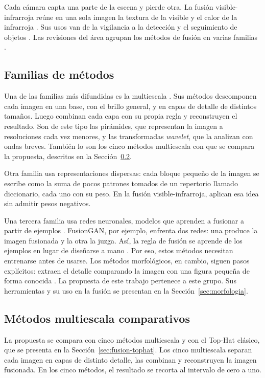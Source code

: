 Cada cámara capta una parte de la escena y pierde otra. La fusión visible-infrarroja reúne en una sola
imagen la textura de la visible y el calor de la infrarroja \parencite{ma2019}. Sus usos van de la
vigilancia a la detección y el seguimiento de objetos \parencite{li2017, zhang2023}. Las revisiones del
área agrupan los métodos de fusión en varias familias \parencite{li2017, ma2019, singh2023}.

\subsection{Familias de métodos}

Una de las familias más difundidas es la multiescala \parencite{li2017}. Sus métodos descomponen cada
imagen en una base, con el brillo general, y en capas de detalle de distintos tamaños. Luego combinan
cada capa con su propia regla y reconstruyen el resultado. Son de este tipo las pirámides, que
representan la imagen a resoluciones cada vez menores, y las transformadas \textit{wavelet}, que la
analizan con ondas breves. También lo son los cinco métodos multiescala con que se compara la propuesta,
descritos en la Sección~\ref{sec:comparativos}.

Otra familia usa representaciones dispersas: cada bloque pequeño de la imagen se escribe como la suma de
pocos patrones tomados de un repertorio llamado diccionario, cada uno con su peso. En la fusión
visible-infrarroja, \textcite{wang2014} aplican esa idea sin admitir pesos negativos.

Una tercera familia usa redes neuronales, modelos que aprenden a fusionar a partir de ejemplos
\parencite{zhang2023}. FusionGAN, por ejemplo, enfrenta dos redes: una produce la imagen fusionada y la
otra la juzga. Así, la regla de fusión se aprende de los ejemplos en lugar de diseñarse a mano
\parencite{ma2019b}. Por eso, estos métodos necesitan entrenarse antes de usarse. Los métodos
morfológicos, en cambio, siguen pasos explícitos: extraen el detalle comparando la imagen con una figura
pequeña de forma conocida \parencite{serra1982}. La propuesta de este trabajo pertenece a este grupo.
Sus herramientas y su uso en la fusión se presentan en la Sección~\ref{sec:morfologia}.

\subsection{Métodos multiescala comparativos}
\label{sec:comparativos}

La propuesta se compara con cinco métodos multiescala y con el Top-Hat clásico, que se presenta en la
Sección~\ref{sec:fusion-tophat}. Los cinco multiescala separan cada imagen en capas de distinto detalle,
las combinan y reconstruyen la imagen fusionada. En los cinco métodos, el resultado se recorta al
intervalo de cero a uno.

